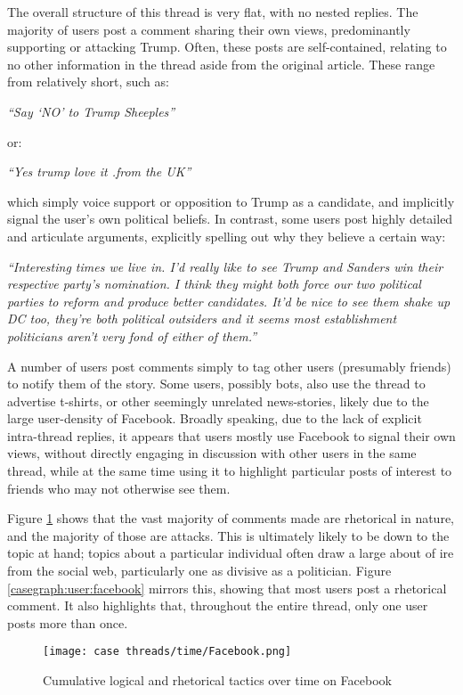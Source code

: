 The overall structure of this thread is very flat, with no nested replies. The majority of users post a comment sharing their own views, predominantly supporting or attacking Trump. Often, these posts are self-contained, relating to no other information in the thread aside from the original article. These range from relatively short, such as:

\textit{``Say `NO' to Trump Sheeples''}

or:

\textit{``Yes trump love it .from the UK''}

which simply voice support or opposition to Trump as a candidate, and implicitly signal the
user's own political beliefs. In contrast, some users post highly detailed and articulate arguments, explicitly spelling out why they believe a certain way:

\textit{``Interesting times we live in. I'd really like to see Trump and Sanders win their respective party's nomination. I think they might both force our two political parties to reform and produce better candidates. It'd be nice to see them shake up DC too, they're both political outsiders and it seems most establishment politicians aren't very fond of either of them.''}

A number of users post comments simply to tag other users (presumably friends) to notify
them of the story. Some users, possibly bots, also use the thread to advertise t-shirts, or other seemingly unrelated news-stories, likely due to the large user-density of Facebook.
Broadly speaking, due to the lack of explicit intra-thread replies, it appears that users mostly use Facebook to signal their own views, without directly engaging in discussion with other users in the same thread, while at the same time using it to highlight particular posts of interest to friends who may not otherwise see them.

Figure \ref{casegraph:time:facebook} shows that the vast majority of comments made are rhetorical in nature, and the majority of those are attacks. This is ultimately likely to be down to the topic at hand; topics about a particular individual often draw a large about of ire from the social web, particularly one as divisive as a politician. Figure \ref{casegraph:user:facebook} mirrors this, showing that most users post a rhetorical comment. It also highlights that, throughout the entire thread, only one user posts more than once.
 
\begin{figure}
\centering
\texttt{[image: case threads/time/Facebook.png]}
\caption{Cumulative logical and rhetorical tactics over time on Facebook}
\label{casegraph:time:facebook}
\end{figure}

